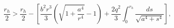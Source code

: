 \begin{equation}
\frac{r_h}{2} > \frac{r_h}{2}- [\frac{b^2r^3}{3}(\sqrt{1+\frac{a^4}{r^4}}-1)+
\frac{2q^2}{3} \int^{r_h}_{0}{\frac{ds}{\sqrt{a^4+s^4}}}],
\end{equation}

